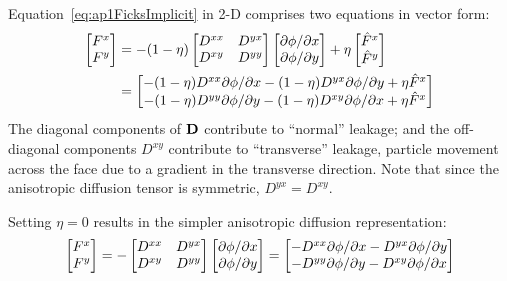 Equation~\eqref{eq:ap1FicksImplicit} in 2-D comprises two equations in vector
form:
\begin{align}\label{eq:ficks2d}
  \begin{bmatrix}
    F^{x} \\
    F^{y}
  \end{bmatrix}
  &= - (1 - \eta)
  \begin{bmatrix}
    D^{xx} & D^{yx} \\
    D^{xy} & D^{yy}
  \end{bmatrix}
  \begin{bmatrix}
    {\partial \phi}/{\partial x} \\
    {\partial \phi}/{\partial y}
  \end{bmatrix}
  + \eta
  \begin{bmatrix}
    \hat{F}^{x} \\
    \hat{F}^{y}
  \end{bmatrix}
  \\ \nonumber
  &= 
  \begin{bmatrix}
    - (1 - \eta)D^{xx} {\partial \phi}/{\partial x}
    - (1 - \eta)D^{yx} {\partial \phi}/{\partial y}
    + \eta \hat{F}^{x}
    \\
    - (1 - \eta)D^{yy} {\partial \phi}/{\partial y}
    - (1 - \eta)D^{xy} {\partial \phi}/{\partial x}
    + \eta \hat{F}^{x}
  \end{bmatrix}
\end{align}
The diagonal components of $\mathbf{D}$ contribute to ``normal''
leakage; and the off-diagonal components $D^{xy}$ contribute to ``transverse''
leakage, particle movement across the face due to a gradient in the transverse
direction.
Note that since the anisotropic diffusion tensor is symmetric,
$D^{yx}=D^{xy}$.

Setting $\eta=0$ results in the simpler anisotropic diffusion representation:
\begin{equation}\label{eq:adFicks2d}
  \begin{bmatrix}
    F^{x} \\
    F^{y}
  \end{bmatrix}
  = -
  \begin{bmatrix}
    D^{xx} & D^{yx} \\
    D^{xy} & D^{yy}
  \end{bmatrix}
  \begin{bmatrix}
    {\partial \phi}/{\partial x} \\
    {\partial \phi}/{\partial y}
  \end{bmatrix}
  = 
  \begin{bmatrix}
    - D^{xx} {\partial \phi}/{\partial x}
    - D^{yx} {\partial \phi}/{\partial y}
    \\
    - D^{yy} {\partial \phi}/{\partial y}
    - D^{xy} {\partial \phi}/{\partial x}
  \end{bmatrix}
\end{equation}

